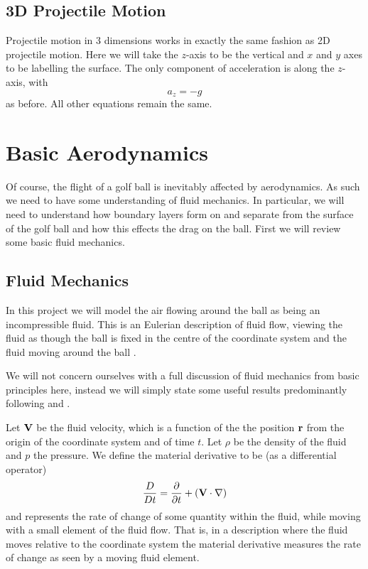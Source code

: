 \subsection{3D Projectile Motion}

Projectile motion in 3 dimensions works in exactly the same fashion as 2D projectile motion. Here we
will take the $z$-axis to be the vertical and $x$ and $y$ axes to be labelling the surface. The only
component of acceleration is along the $z$-axis, with
\[
a_z = -g
\]
as before. All other equations remain the same.

\section{Basic Aerodynamics}

Of course, the flight of a golf ball is inevitably affected by aerodynamics. As such we need to have
some understanding of fluid mechanics. In particular, we will need to understand how boundary layers
form on and separate from the surface of the golf ball and how this effects the drag on the ball.
First we will review some basic fluid mechanics.

\subsection{Fluid Mechanics}

In this project we will model the air flowing around the ball as being an incompressible fluid. This
is an Eulerian description of fluid flow, viewing the fluid as though the ball is fixed in the centre
of the coordinate system and the fluid moving around the ball \citet{Ruban2014}.

We will not concern ourselves with a full discussion of fluid mechanics from basic principles here, 
instead we will simply state some useful results predominantly following \citet{Ruban2014} and 
\citet{sears}.

Let $\mathbf{V}$ be the fluid velocity, which is a function of the the position $\mathbf{r}$ from the origin of the
coordinate system and of time $t$. Let $\rho$ be the density of the fluid and $p$ the pressure. 
We define the material derivative to be (as a differential operator)
\begin{equation} \nonumber
\frac{D}{Dt} = \frac{\partial}{\partial t} + (\mathbf{V} \cdot \nabla)
\end{equation}
and represents the rate of change of some quantity within the fluid, while moving with a small element
of the fluid flow. That is, in a description where the fluid moves relative to the coordinate system
the material derivative measures the rate of change as seen by a moving fluid element.

